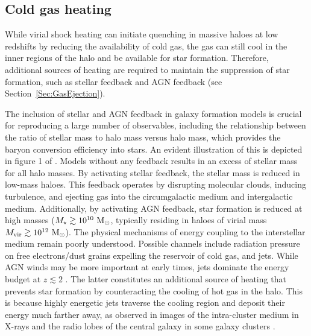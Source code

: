 \documentclass[baaa]{baaa}
\begin{document}
\subsection{Cold gas heating}
\label{Sec:ColdGasHeated}

While virial shock heating can initiate quenching in massive haloes at low redshifts by reducing the availability of cold gas, the gas can still cool in the inner regions of the halo and be available for star formation. Therefore, additional sources of heating are required to maintain the suppression of star formation, such as stellar feedback and  AGN feedback (see Section~\ref{Sec:GasEjection}).

The inclusion of stellar and AGN feedback in galaxy formation models is crucial for reproducing a large number of observables, including the relationship between the ratio of stellar mass to halo mass versus halo mass, which provides the baryon conversion efficiency into stars. An evident illustration of this is depicted in figure 1 of \cite{Harrison_2017}. 
Models without any feedback results in an excess of stellar mass for all halo masses.
%
By activating stellar feedback, the stellar mass is reduced in low-mass haloes. This feedback operates by disrupting molecular clouds, inducing turbulence, and ejecting gas into the circumgalactic medium and intergalactic medium.
%
Additionally, by activating AGN feedback, star formation is reduced at high masses ($M_{\star} \gtrsim 10^{10}~{\rm M}_{\odot}$, typically residing in haloes of virial mass $M_{\rm vir} \gtrsim 10^{12}~{\rm M}_{\odot}$). The physical mechanisms of energy coupling to the interstellar medium remain poorly understood. Possible channels include radiation pressure on free electrons/dust grains expelling the reservoir of cold gas, and jets.
While AGN winds may be more important at early times,
jets dominate the energy budget at $z \lesssim 2$ \cite{Kondapally_2023}.
%
The latter constitutes an additional source of heating that prevents star formation by counteracting the cooling of hot gas in the halo. This is because highly energetic jets traverse the cooling region and deposit their energy much farther away, as observed in images of the intra-cluster medium in X-rays and the radio lobes of the central galaxy in some galaxy clusters \citep{McNamara_2009, Fabian_2012}.
\end{document}
